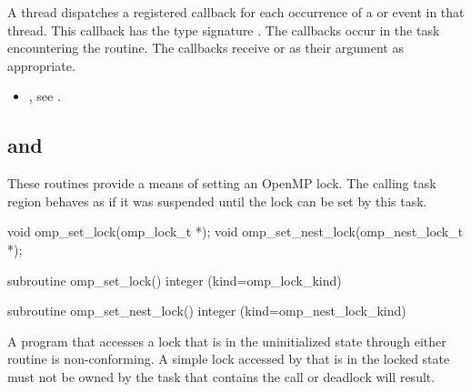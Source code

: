 A thread dispatches a registered 
callback for each occurrence of a  or  event 
in that thread.  This callback has the type signature .
The callbacks occur in the task encountering the routine.
The callbacks receive  or 
  as their  argument as appropriate.


\crossreferences
\begin{itemize}
\item {}, see 
.
\end{itemize}









\subsection{ and }
\label{subsec:omp_set_lock and omp_set_nest_lock}
\summary
These routines provide a means of setting an OpenMP lock. The calling
task region behaves as if it was suspended until the lock can be set
by this task.

\format
\begin{ccppspecific}
\begin{boxedcode}
void omp\_set\_lock(omp\_lock\_t *);
void omp\_set\_nest\_lock(omp\_nest\_lock\_t *);
\end{boxedcode}
\end{ccppspecific}

\begin{fortranspecific}
\begin{boxedcode}
subroutine omp\_set\_lock()
integer (kind=omp\_lock\_kind) 

subroutine omp\_set\_nest\_lock()
integer (kind=omp\_nest\_lock\_kind) 
\end{boxedcode}
\end{fortranspecific}

\constraints
A program that accesses a lock that is in the uninitialized state through either routine is 
non-conforming. A simple lock accessed by  that is in the locked state 
must not be owned by the task that contains the call or deadlock will result.

